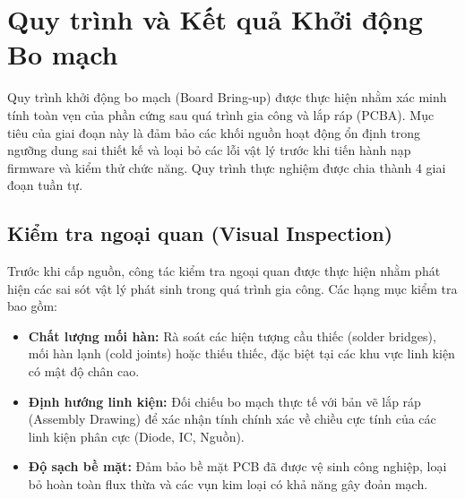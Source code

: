 \section{Quy trình và Kết quả Khởi động Bo mạch}

    Quy trình khởi động bo mạch (Board Bring-up) được thực hiện nhằm xác minh tính toàn vẹn của phần cứng sau quá trình gia công và lắp ráp (PCBA). Mục tiêu của giai đoạn này là đảm bảo các khối nguồn hoạt động ổn định trong ngưỡng dung sai thiết kế và loại bỏ các lỗi vật lý trước khi tiến hành nạp firmware và kiểm thử chức năng. Quy trình thực nghiệm được chia thành 4 giai đoạn tuần tự.

    \subsection{Kiểm tra ngoại quan (Visual Inspection)}
        Trước khi cấp nguồn, công tác kiểm tra ngoại quan được thực hiện nhằm phát hiện các sai sót vật lý phát sinh trong quá trình gia công. Các hạng mục kiểm tra bao gồm:

        \begin{itemize}
            \item \textbf{Chất lượng mối hàn:} Rà soát các hiện tượng cầu thiếc (solder bridges), mối hàn lạnh (cold joints) hoặc thiếu thiếc, đặc biệt tại các khu vực linh kiện có mật độ chân cao.
            \item \textbf{Định hướng linh kiện:} Đối chiếu bo mạch thực tế với bản vẽ lắp ráp (Assembly Drawing) để xác nhận tính chính xác về chiều cực tính của các linh kiện phân cực (Diode, IC, Nguồn).
            \item \textbf{Độ sạch bề mặt:} Đảm bảo bề mặt PCB đã được vệ sinh công nghiệp, loại bỏ hoàn toàn flux thừa và các vụn kim loại có khả năng gây đoản mạch.
        \end{itemize}

